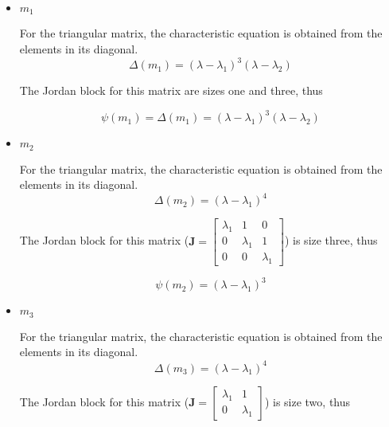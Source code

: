 \begin{itemize}
 \item $m_1$

 For the triangular matrix, the characteristic equation
 is obtained from the elements in its diagonal.
 \begin{equation*}
  \Delta(m_1) = (\lambda - \lambda_1)^3(\lambda - \lambda_2)
 \end{equation*}

 The Jordan block for this matrix are sizes one and three, thus

 \begin{equation*}
  \psi (m_1) = \Delta(m_1) = (\lambda - \lambda_1)^3(\lambda - \lambda_2)
 \end{equation*}


 \item $m_2$

  For the triangular matrix, the characteristic equation
 is obtained from the elements in its diagonal.
 \begin{equation*}
  \Delta(m_2) = (\lambda - \lambda_1)^4
 \end{equation*}

 The Jordan block for this matrix
 ($\mathbf{J} = \begin{bmatrix}
                    \lambda_1 & 1 & 0\\
                    0 & \lambda_1 & 1\\
                    0 & 0 & \lambda_1
                \end{bmatrix}$)
 is size three, thus

 \begin{equation*}
  \psi (m_2) = (\lambda - \lambda_1)^3
 \end{equation*}

 \item $m_3$

   For the triangular matrix, the characteristic equation
 is obtained from the elements in its diagonal.
 \begin{equation*}
  \Delta(m_3) = (\lambda - \lambda_1)^4
 \end{equation*}

 The Jordan block for this matrix ($\mathbf{J} = \begin{bmatrix}
                                    \lambda_1 & 1 \\
                                    0 & \lambda_1
                                    \end{bmatrix}$)
is size two, thus


\end{itemize}
